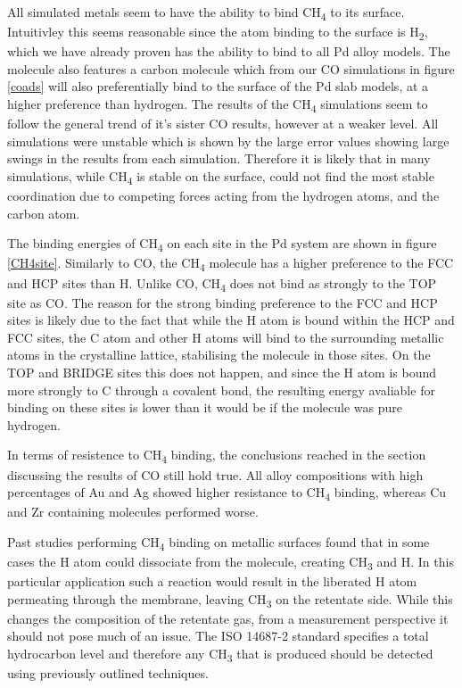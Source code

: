 All simulated metals seem to have the ability to bind CH\textsubscript{4} to its surface. Intuitivley this seems reasonable since the atom binding to the surface is H\textsubscript{2}, which we have already proven has the ability to bind to all Pd alloy models. The molecule also features a carbon molecule which from our CO simulations in figure \ref{coads} will also preferentially bind to the surface of the Pd slab models, at a higher preference than hydrogen. The results of the CH\textsubscript{4} simulations seem to follow the general trend of it's sister CO results, however at a weaker level.  All simulations were unstable which is shown by the large error values showing large swings in the results from each simulation. Therefore it is likely that in many simulations, while CH\textsubscript{4} is stable on the surface, could not find the most stable coordination due to competing forces acting from the hydrogen atoms, and the carbon atom. 

The binding energies of CH\textsubscript{4} on each site in the Pd system are shown in figure \ref{CH4site}. Similarly to CO, the CH\textsubscript{4} molecule has a higher preference to the FCC and HCP sites than H. Unlike CO, CH\textsubscript{4} does not bind as strongly to the TOP site as CO. The reason for the strong binding preference to the FCC and HCP sites is likely due to the fact that while the H atom is bound within the HCP and FCC sites, the C atom and other H atoms will bind to the surrounding metallic atoms in the crystalline lattice, stabilising the molecule in those sites. On the TOP and BRIDGE sites this does not happen, and since the H atom is bound more strongly to C through a covalent bond, the resulting energy avaliable for binding on these sites is lower than it would be if the molecule was pure hydrogen. 

In terms of resistence to CH\textsubscript{4} binding, the conclusions reached in the section discussing the results of CO still hold true. All alloy compositions with high percentages of Au and Ag showed higher resistance to CH\textsubscript{4} binding, whereas Cu and Zr containing molecules performed worse. 

Past studies performing CH\textsubscript{4} binding on metallic surfaces found that in some cases the H atom could dissociate from the molecule, creating CH\textsubscript{3} and H. \cite{doi:10.1021/acs.jpcc.8b03184} In this particular application such a reaction would result in the liberated H atom permeating through the membrane, leaving CH\textsubscript{3} on the retentate side. While this changes the composition of the retentate gas, from a measurement perspective it should not pose much of an issue. The ISO 14687-2\cite{InternationalStandardISO14687-2:20122012} standard specifies a total hydrocarbon level and therefore any CH\textsubscript{3} that is produced should be detected using previously outlined techniques. \cite{Murugan2015}

